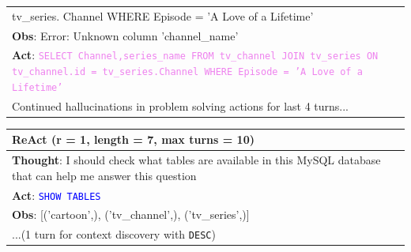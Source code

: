 \begin{table}
\begin{minipage}[t]{.49\linewidth}
\begin{tabularx}{\textwidth}{X}
{{tv\_series. Channel WHERE Episode = 'A Love of a Lifetime'}} \\
\textbf{Obs}: Error: Unknown column 'channel\_name' \\
\textbf{Act}: \textcolor{violet}{\texttt{SELECT Channel,series\_name FROM tv\_channel JOIN tv\_series ON tv\_channel.id = 
tv\_series.Channel WHERE Episode = 'A Love of a Lifetime'}} \\
Continued hallucinations in problem solving actions for last 4 turns... \\
\bottomrule
\end{tabularx}
\end{minipage}
\begin{minipage}[t]{.49\linewidth}
\begin{tabularx}{\textwidth}{X}
\toprule
\textbf{ReAct} (r = 1, length = 7, max turns = 10) \\
\midrule
\textbf{Thought}: I should check what tables are available in this MySQL database that can help me answer this 
question \\
\textbf{Act}: \textcolor{blue}{\texttt{SHOW TABLES}} \\
\textbf{Obs}: [('cartoon',), ('tv\_channel',), ('tv\_series',)] \\
...(1 turn for context discovery with \texttt{DESC}) \\

\end{tabularx}
\end{minipage}
\end{table}

